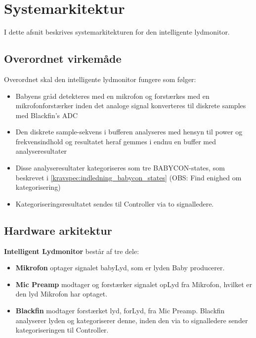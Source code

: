 \newpage
\section{Systemarkitektur}

I dette afsnit beskrives systemarkitekturen for den intelligente lydmonitor.

\subsection*{Overordnet virkemåde}
Overordnet skal den intelligente lydmonitor fungere som følger:
\begin{itemize}
	\item Babyens gråd detekteres med en mikrofon og forstærkes med en mikrofonforstærker inden det analoge signal konverteres til diskrete samples med Blackfin's ADC
	\item Den diskrete sample-sekvens i bufferen analyseres med hensyn til power og frekvensindhold og resultatet heraf gemmes i endnu en buffer med analyseresultater
	\item Disse analyseresultater kategoriseres som tre BABYCON-states, som beskrevet i \ref{kravspec:indledning_babycon_states} (OBS: Find enighed om kategorisering)
	\item Kategoriseringsresultatet sendes til Controller via to signalledere.
\end{itemize}


\newpage
\subsection{Hardware arkitektur}

\textbf{Intelligent Lydmonitor} består af tre dele: 
\begin{itemize}
\item \textbf{Mikrofon} optager signalet babyLyd, som er lyden Baby producerer. 
\item \textbf{Mic Preamp} modtager og forstærker signalet opLyd fra Mikrofon, hvilket er den lyd Mikrofon har optaget. 
\item \textbf{Blackfin} modtager forstærket lyd, forLyd, fra Mic Preamp. Blackfin analyserer lyden og kategoriserer denne, inden den via to signalledere sender kategoriseringen til Controller. 
\end{itemize}

